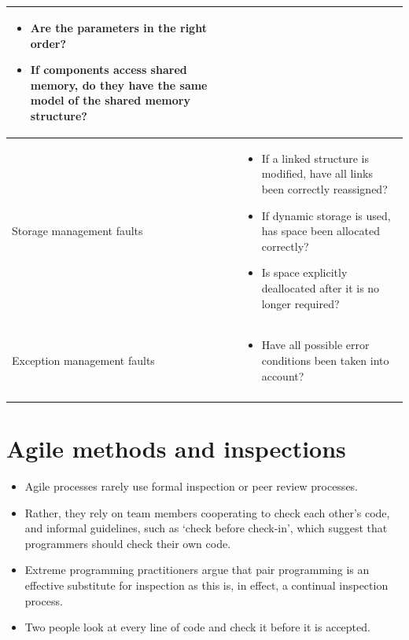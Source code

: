 \begin{longtable}{|p{2cm}|p{8cm}|}
\begin{itemize}
    \item Are the parameters in the right order?
  	\item If components access shared memory, do they have the same model of the shared memory structure?
\end{itemize}\\
\hline
Storage	management faults &
\begin{itemize}
  	\item If a linked structure is modified, have all links been correctly reassigned?
  	\item If dynamic storage is used, has space been allocated correctly?
  	\item Is space explicitly deallocated after it is no longer required?
\end{itemize}\\
\hline
Exception	management faults &
\begin{itemize}
  	\item Have all possible error conditions been taken into account?
\end{itemize}\\
\hline
\caption{}
\label{table:T7_3}
\end{longtable}

\section {Agile methods and inspections}
\begin{itemize}

\item Agile processes rarely use formal inspection or peer review processes.

\item Rather, they rely on team members cooperating to check each other’s code, and informal guidelines, such as ‘check before check-in’, which suggest that programmers should check their own code.

\item Extreme programming practitioners argue that pair programming is an effective substitute for inspection as this is, in effect, a continual inspection process.

\item Two people look at every line of code and check it before it is accepted.

\end{itemize}
